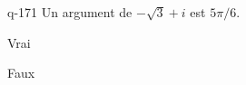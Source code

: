 \begin{truefalse}{q-171}
Un argument de $-\sqrt 3+i$ est $5\pi/6$.
\item* Vrai
\item Faux
\end{truefalse}

